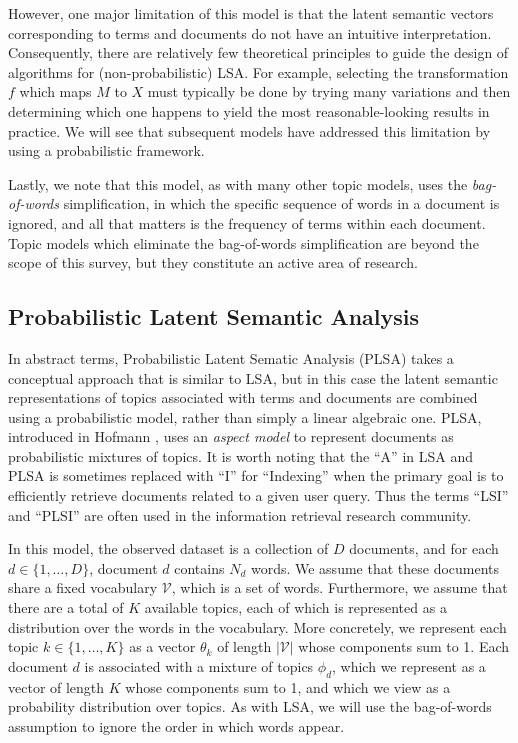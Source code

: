 \documentclass{article}
\begin{document}
However, one major limitation of this model is that the latent semantic vectors corresponding to terms and documents do not have an intuitive interpretation.
Consequently, there are relatively few theoretical principles to guide the design of algorithms for (non-probabilistic) LSA.
For example, selecting the transformation $f$ which maps $M$ to $X$ must typically be done by trying many variations and then determining which one happens to yield the most reasonable-looking results in practice.
We will see that subsequent models have addressed this limitation by using a probabilistic framework.

Lastly, we note that this model, as with many other topic models, uses the \emph{bag-of-words} simplification, in which the specific sequence of words in a document is ignored, and all that matters is the frequency of terms within each document.
Topic models which eliminate the bag-of-words simplification are beyond the scope of this survey, but they constitute an active area of research.

\subsection{Probabilistic Latent Semantic Analysis}

In abstract terms, Probabilistic Latent Sematic Analysis (PLSA) takes a conceptual approach that is similar to LSA, but in this case the latent semantic representations of topics associated with terms and documents are combined using a probabilistic model, rather than simply a linear algebraic one.
PLSA, introduced in Hofmann \cite{hofmann1999plsa}, uses an \emph{aspect model} to represent documents as probabilistic mixtures of topics.
It is worth noting that the ``A'' in LSA and PLSA is sometimes replaced with ``I'' for ``Indexing'' when the primary goal is to efficiently retrieve documents related to a given user query.
Thus the terms ``LSI'' and ``PLSI'' are often used in the information retrieval research community.

In this model, the observed dataset is a collection of $D$ documents, and for each $d \in \{1, \ldots, D\}$, document $d$ contains $N_d$ words.
We assume that these documents share a fixed vocabulary $\mathcal V$, which is a set of words.
Furthermore, we assume that there are a total of $K$ available topics, each of which is represented as a distribution over the words in the vocabulary.
More concretely, we represent each topic $k \in \{1, \ldots, K\}$ as a vector $\theta_k$ of length $|\mathcal V|$ whose components sum to 1.
Each document $d$ is associated with a mixture of topics $\phi_d$, which we represent as a vector of length $K$ whose components sum to 1, and which we view as a probability distribution over topics.
As with LSA, we will use the bag-of-words assumption to ignore the order in which words appear.
\end{document}
